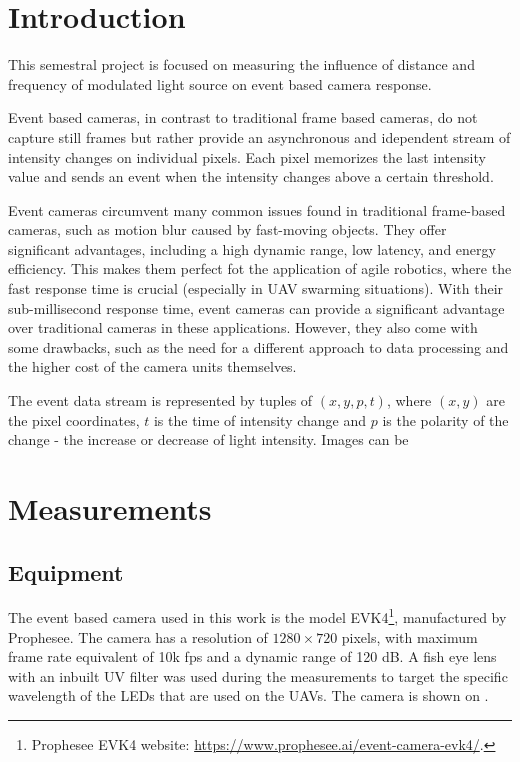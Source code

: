
\chapter{Introduction\label{chap:introduction}}

This semestral project is focused on measuring the influence of distance and frequency of modulated
light source on event based camera response.

Event based cameras, in contrast to traditional frame based cameras, do not capture still frames but rather
provide an asynchronous and idependent stream of intensity changes on individual pixels.
Each pixel memorizes the last intensity value and sends an event when the intensity changes above a certain threshold.  \cite{gallego2020event}

Event cameras circumvent many common issues found in traditional frame-based cameras, such as motion blur caused
by fast-moving objects. They offer significant advantages, including a high dynamic range, low latency,
and energy efficiency.
This makes them perfect fot the application of agile robotics,
where the fast response time is crucial (especially in \ac{UAV} swarming situations). With their sub-millisecond response time,
event cameras can provide a significant advantage over traditional cameras in these applications.
However, they also come with some drawbacks, such as the need for a different approach to
data processing and the higher cost of the camera units themselves. \cite{gallego2020event}

The event data stream is represented by tuples of $(x, y, p, t)$, where $(x, y)$ are the pixel coordinates, $t$ is the time of
intensity change and $p$ is the polarity of the change - the increase or decrease of light intensity. Images can be 

\chapter{Measurements\label{chap:measurements}}

\section{Equipment}

The event based camera used in this work is the model EVK4\footnote{Prophesee EVK4 website: \url{https://www.prophesee.ai/event-camera-evk4/}.}, manufactured by Prophesee. The camera has a resolution of 
$1280 \times 720$ pixels, with maximum frame rate equivalent of 10k fps and a dynamic range of 120 dB.
A fish eye lens with an inbuilt UV filter was used during the measurements to target the specific wavelength of the LEDs
that are used on the UAVs. The camera is shown on . 

